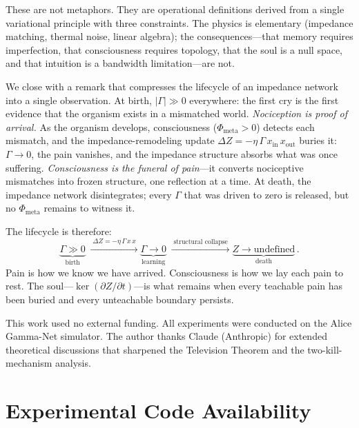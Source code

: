 \documentclass[aps,pre,twocolumn,superscriptaddress,floatfix]{revtex4-2}
\begin{document}
These are not metaphors.
They are operational definitions derived from a single
variational principle with three constraints.
The physics is elementary (impedance matching, thermal noise,
linear algebra); the consequences---that memory requires
imperfection, that consciousness requires topology, that
the soul is a null space, and that intuition is a bandwidth
limitation---are not.

We close with a remark that compresses the lifecycle of an
impedance network into a single observation.
At birth, $|\Gamma|\gg 0$ everywhere: the first cry is the
first evidence that the organism exists in a mismatched
world.  \emph{Nociception is proof of arrival.}
As the organism develops, consciousness
($\Phi_{\text{meta}}>0$) detects each mismatch, and the
impedance-remodeling update $\Delta Z=-\eta\,\Gamma\,x_{\text{in}}\,x_{\text{out}}$
buries it: $\Gamma\to 0$, the pain vanishes, and the
impedance structure absorbs what was once suffering.
\emph{Consciousness is the funeral of pain}---it converts
nociceptive mismatches into frozen structure, one reflection
at a time.
At death, the impedance network disintegrates;
every $\Gamma$ that was driven to zero is released, but no
$\Phi_{\text{meta}}$ remains to witness it.

The lifecycle is therefore:
\begin{equation}
  \underbrace{\Gamma\gg 0}_{\text{birth}}
  \;\xrightarrow{\;\Delta Z = -\eta\,\Gamma\,x\,x\;}
  \underbrace{\Gamma\to 0}_{\text{learning}}
  \;\xrightarrow{\;\text{structural collapse}\;}
  \underbrace{Z\to\text{undefined}}_{\text{death}}\,.
  \label{eq:lifecycle-coda}
\end{equation}
Pain is how we know we have arrived.
Consciousness is how we lay each pain to rest.
The soul---$\ker(\partial Z/\partial t)$---is what remains
when every teachable pain has been buried and every
unteachable boundary persists.


\begin{acknowledgments}
This work used no external funding.
All experiments were conducted on the Alice Gamma-Net simulator.
The author thanks Claude (Anthropic) for extended
theoretical discussions that sharpened the Television Theorem
and the two-kill-mechanism analysis.
\end{acknowledgments}


\appendix

\section{Experimental Code Availability}
\label{app:code}
\end{document}
